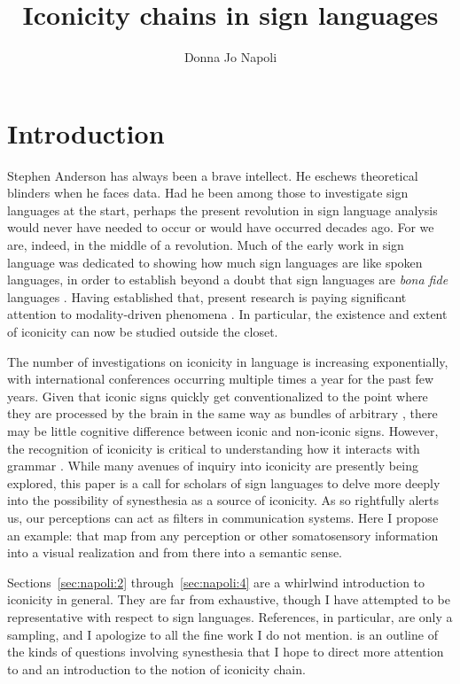 \documentclass[output=paper,
modfonts
]{LSP/langsci}
\title{Iconicity chains in sign languages}
\author{%
 Donna Jo Napoli\affiliation{Swarthmore College}
}
\begin{document}
\maketitle



\section{Introduction}

Stephen Anderson has always been a brave intellect. He eschews
theoretical blinders when he faces data. Had he been among those to
investigate sign languages at the start, perhaps the present revolution
in sign language analysis would never have needed to occur or would have
occurred decades ago. For we are, indeed, in the middle of a revolution.
Much of the early work in sign language  was dedicated to
showing how much sign languages are like spoken languages, in order to
establish beyond a doubt that sign languages are \emph{bona fide}
languages \citep{vermeerbergen2006}. Having established that, present research is paying
significant attention to modality-driven phenomena \citep{meier2002,woll2003}. In particular, the existence and extent of iconicity can now be
studied outside the closet.

The number of investigations on iconicity in language is increasing
exponentially, with international conferences occurring multiple times a
year for the past few years. Given that iconic signs quickly get
conventionalized to the point where they are processed by the brain in
the same way as bundles of arbitrary  \citep{emmorey2004,fabisiak2011}, there may be little cognitive difference
between iconic and non-iconic signs. However, the recognition of
iconicity is critical to understanding how it interacts with grammar
\citep{meir2013}. While many avenues of inquiry into iconicity are
presently being explored, this paper is a call for scholars of sign
languages to delve more deeply into the possibility of synesthesia as a
source of iconicity. As \citet{anderson2011,anderson2016} so rightfully alerts us,
our perceptions can act as filters in communication systems. Here I
propose an example:  that map from any perception or other somatosensory information into a
visual realization and from there into a semantic sense.

Sections~\ref{sec:napoli:2} through~\ref{sec:napoli:4} are a whirlwind introduction to iconicity in
general. They are far from exhaustive, though I have attempted to be
representative with respect to sign languages. References, in
particular, are only a sampling, and I apologize to all the fine work I
do not mention.  is an outline of the kinds of questions
involving synesthesia that I hope to direct more attention to and an
introduction to the notion of iconicity chain.
\end{document}
